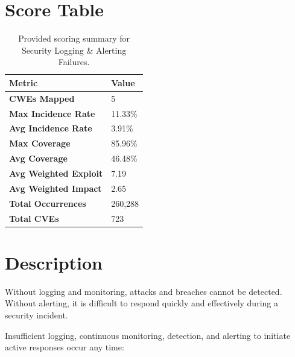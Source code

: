 \documentclass[11pt]{article}
\begin{document}
\section{Score Table}
\begin{table}[h!]
\centering
\renewcommand{\arraystretch}{1.2}
\begin{tabular}{@{}>{\bfseries}p{4.9cm}p{3.1cm}@{}}
\toprule
Metric & Value \\
\midrule
CWEs Mapped & 5 \\
Max Incidence Rate & 11.33\% \\
Avg Incidence Rate & 3.91\% \\
Max Coverage & 85.96\% \\
Avg Coverage & 46.48\% \\
Avg Weighted Exploit & 7.19 \\
Avg Weighted Impact & 2.65 \\
Total Occurrences & 260{,}288 \\
Total CVEs & 723 \\
\bottomrule
\end{tabular}
\caption{Provided scoring summary for Security Logging \& Alerting Failures.}
\end{table}

\section{Description}
Without logging and monitoring, attacks and breaches cannot be detected. Without alerting, it is difficult to respond quickly and effectively during a security incident.

Insufficient logging, continuous monitoring, detection, and alerting to initiate active responses occur any time:
\end{document}

